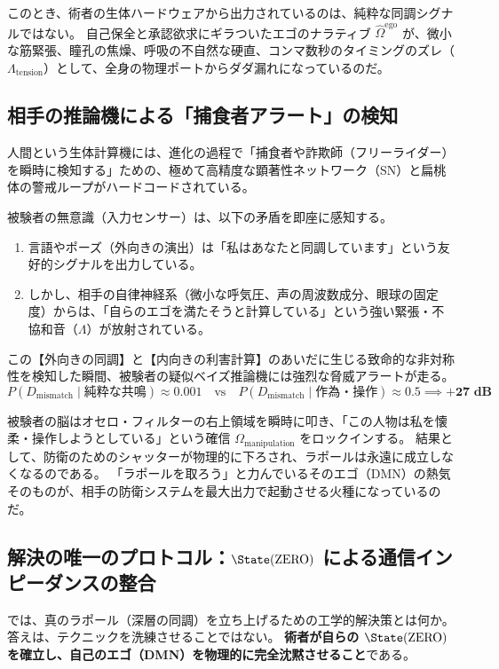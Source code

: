このとき、術者の生体ハードウェアから出力されているのは、純粋な同調シグナルではない。
自己保全と承認欲求にギラついたエゴのナラティブ $\hat{\Omega}^{\mathrm{ego}}$ が、微小な筋緊張、瞳孔の焦燥、呼吸の不自然な硬直、コンマ数秒のタイミングのズレ（$\Lambda_{\mathrm{tension}}$）として、全身の物理ポートからダダ漏れになっているのだ。

\subsection{相手の推論機による「捕食者アラート」の検知}
人間という生体計算機には、進化の過程で「捕食者や詐欺師（フリーライダー）を瞬時に検知する」ための、極めて高精度な顕著性ネットワーク（SN）と扁桃体の警戒ループがハードコードされている。

被験者の無意識（入力センサー）は、以下の矛盾を即座に感知する。
\begin{enumerate}[label=(\arabic*)]
    \item 言語やポーズ（外向きの演出）は「私はあなたと同調しています」という友好的シグナルを出力している。
    \item しかし、相手の自律神経系（微小な呼気圧、声の周波数成分、眼球の固定度）からは、「自らのエゴを満たそうと計算している」という強い緊張・不協和音（$\Lambda$）が放射されている。
\end{enumerate}

この【外向きの同調】と【内向きの利害計算】のあいだに生じる致命的な非対称性を検知した瞬間、被験者の疑似ベイズ推論機には強烈な脅威アラートが走る。
\begin{equation}
    P(D_{\mathrm{mismatch}} \mid \text{純粋な共鳴}) \approx 0.001 \quad \text{vs} \quad P(D_{\mathrm{mismatch}} \mid \text{作為・操作}) \approx 0.5 \implies \mathbf{+27\text{ dB}}
\end{equation}

被験者の脳はオセロ・フィルターの右上領域を瞬時に叩き、「この人物は私を懐柔・操作しようとしている」という確信 $\Omega_{\mathrm{manipulation}}$ をロックインする。
結果として、防衛のためのシャッターが物理的に下ろされ、ラポールは永遠に成立しなくなるのである。
「ラポールを取ろう」と力んでいるそのエゴ（DMN）の熱気そのものが、相手の防衛システムを最大出力で起動させる火種になっているのだ。

\subsection{解決の唯一のプロトコル：$\State(\mathrm{ZERO})$ による通信インピーダンスの整合}
では、真のラポール（深層の同調）を立ち上げるための工学的解決策とは何か。
答えは、テクニックを洗練させることではない。
\textbf{術者が自らの $\State(\mathrm{ZERO})$ を確立し、自己のエゴ（DMN）を物理的に完全沈黙させること}である。

